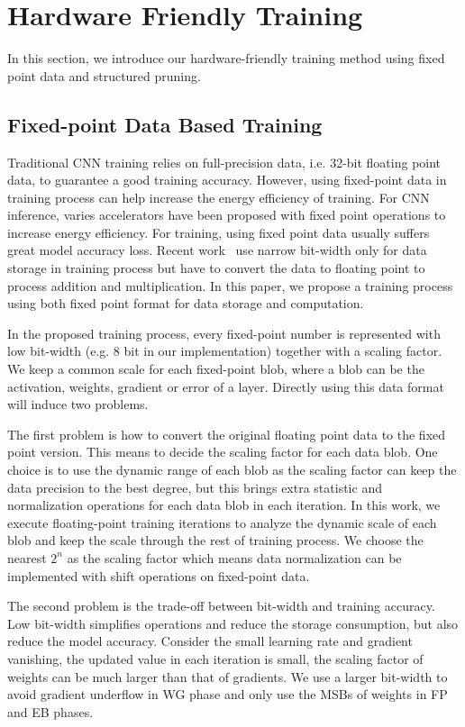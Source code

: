 \section{Hardware Friendly Training}\label{sec:training}
In this section, we introduce our hardware-friendly training method using fixed point data and structured pruning. 

\subsection{Fixed-point Data Based Training}
Traditional CNN training relies on full-precision data, i.e. 32-bit floating point data, to guarantee a good training accuracy. However, using fixed-point data in training process can help increase the energy efficiency of training. For CNN inference, varies accelerators have been proposed with fixed point operations to increase energy efficiency. For training, using fixed point data usually suffers great model accuracy loss. Recent work~\cite{zhou2016dorefa} use narrow bit-width only for data storage in training process but have to convert the data to floating point to process addition and multiplication. In this paper, we propose a training process using both fixed point format for data storage and computation. 

In the proposed training process, every fixed-point number is represented with low bit-width (e.g. 8 bit in our implementation) together with a scaling factor. We keep a common scale for each fixed-point blob, where a blob can be the activation, weights, gradient or error of a layer. Directly using this data format will induce two problems.

The first problem is how to convert the original floating point data to the fixed point version. This means to decide the scaling factor for each data blob. One choice is to use the dynamic range of each blob as the scaling factor can keep the data precision to the best degree, but this brings extra statistic and normalization operations for each data blob in each iteration. In this work, we execute floating-point training iterations to analyze the dynamic scale of each blob and keep the scale through the rest of training process. We choose the nearest $2^n$ as the scaling factor which means data normalization can be implemented with shift operations on fixed-point data.

The second problem is the trade-off between bit-width and training accuracy. Low bit-width simplifies operations and reduce the storage consumption, but also reduce the model accuracy. Consider the small learning rate and gradient vanishing, the updated value in each iteration is small, the scaling factor of weights can be much larger than that of gradients. We use a larger bit-width to avoid gradient underflow in WG phase and only use the MSBs of weights in FP and EB phases.

